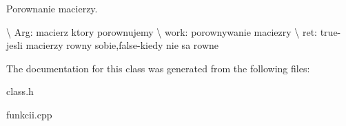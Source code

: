 Porownanie macierzy. 

\textbackslash{} Arg\-: macierz ktory porownujemy \textbackslash{} work\-: porownywanie maciezry \textbackslash{} ret\-: true-\/jesli macierzy rowny sobie,false-\/kiedy nie sa rowne 

The documentation for this class was generated from the following files\-:\begin{DoxyCompactItemize}
\item 
class.\-h\item 
funkcii.\-cpp\end{DoxyCompactItemize}
